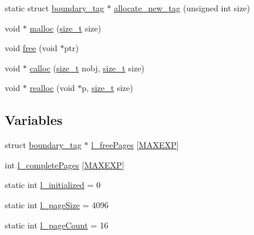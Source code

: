 \begin{DoxyCompactItemize}
static struct \hyperlink{a00095}{boundary\+\_\+tag} $\ast$ \hyperlink{a00023_a8e465ea231c950756bcd4e41244c61a1_a8e465ea231c950756bcd4e41244c61a1}{allocate\+\_\+new\+\_\+tag} (unsigned int size)
\item 
void $\ast$ \hyperlink{a00023_a7ac38fce3243a7dcf448301ee9ffd392_a7ac38fce3243a7dcf448301ee9ffd392}{malloc} (\hyperlink{a00026_a7c94ea6f8948649f8d181ae55911eeaf_a7c94ea6f8948649f8d181ae55911eeaf}{size\+\_\+t} size)
\item 
void \hyperlink{a00023_afbedc913aa4651b3c3b4b3aecd9b4711_afbedc913aa4651b3c3b4b3aecd9b4711}{free} (void $\ast$ptr)
\item 
void $\ast$ \hyperlink{a00023_a0831129f5172700d42788e7201bdb25e_a0831129f5172700d42788e7201bdb25e}{calloc} (\hyperlink{a00026_a7c94ea6f8948649f8d181ae55911eeaf_a7c94ea6f8948649f8d181ae55911eeaf}{size\+\_\+t} nobj, \hyperlink{a00026_a7c94ea6f8948649f8d181ae55911eeaf_a7c94ea6f8948649f8d181ae55911eeaf}{size\+\_\+t} size)
\item 
void $\ast$ \hyperlink{a00023_ac5f241a082afc3c26df1eb7dfdd8d8e0_ac5f241a082afc3c26df1eb7dfdd8d8e0}{realloc} (void $\ast$p, \hyperlink{a00026_a7c94ea6f8948649f8d181ae55911eeaf_a7c94ea6f8948649f8d181ae55911eeaf}{size\+\_\+t} size)
\end{DoxyCompactItemize}
\subsection*{Variables}
\begin{DoxyCompactItemize}
\item 
struct \hyperlink{a00095}{boundary\+\_\+tag} $\ast$ \hyperlink{a00023_a78b8b6e448179d3cd64915f99fee60e0_a78b8b6e448179d3cd64915f99fee60e0}{l\+\_\+free\+Pages} \mbox{[}\hyperlink{a00023_af823bb7d083fafbd662be7ea09582013_af823bb7d083fafbd662be7ea09582013}{M\+A\+X\+E\+XP}\mbox{]}
\item 
int \hyperlink{a00023_a213db3baf1d4b13d604015489247980d_a213db3baf1d4b13d604015489247980d}{l\+\_\+complete\+Pages} \mbox{[}\hyperlink{a00023_af823bb7d083fafbd662be7ea09582013_af823bb7d083fafbd662be7ea09582013}{M\+A\+X\+E\+XP}\mbox{]}
\item 
static int \hyperlink{a00023_a4aac6ed0ba0144598c5abe18222c3493_a4aac6ed0ba0144598c5abe18222c3493}{l\+\_\+initialized} = 0
\item 
static int \hyperlink{a00023_a5008d6a07ef0a4f9e325993716cc228e_a5008d6a07ef0a4f9e325993716cc228e}{l\+\_\+page\+Size} = 4096
\item 
static int \hyperlink{a00023_a8f81c0408f42ca5d936221d15f918275_a8f81c0408f42ca5d936221d15f918275}{l\+\_\+page\+Count} = 16
\end{DoxyCompactItemize}


